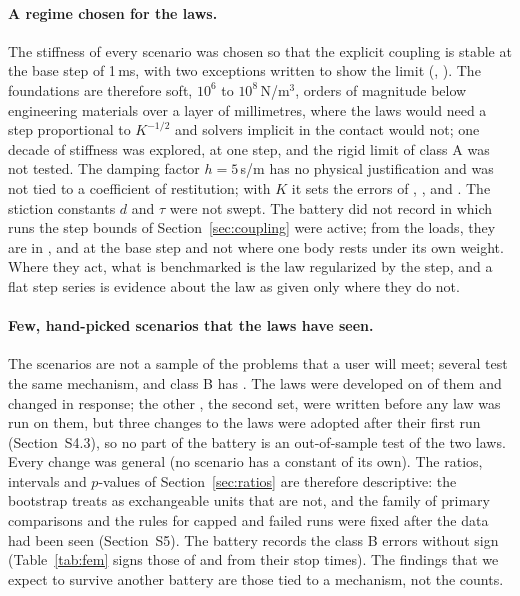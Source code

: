 \paragraph{A regime chosen for the laws.} The stiffness of every scenario was chosen so that
the explicit coupling is stable at the base step of 1\,ms, with two exceptions written to show
the limit (, ). The foundations are therefore soft, $10^6$ to
$10^8$\,N/m$^3$, orders of magnitude below engineering materials over a layer of millimetres,
where the laws would need a step proportional to $K^{-1/2}$ and solvers implicit in the contact
would not; one decade of stiffness was explored, at one step, and the rigid limit of class A
was not tested. The damping factor $h = 5$\,s/m has no physical justification and was not tied
to a coefficient of restitution; with $K$ it sets the errors of , ,
 and . The stiction constants $d$ and $\tau$ were not swept. The
battery did not record in which runs the step bounds of Section~\ref{sec:coupling} were active;
from the loads, they are in ,  and  at the base step and
not where one body rests under its own weight. Where they act, what is benchmarked is the law
regularized by the step, and a flat step series is evidence about the law as given only where
they do not.

\paragraph{Few, hand-picked scenarios that the laws have seen.} The
 scenarios are not a sample of the problems that a user will meet;
several test the same mechanism, and class B has . The laws were developed
on  of them and changed in response; the other ,
the second set, were written before any law was run on them, but three changes to the laws were
adopted after their first run (Section~S4.3), so no part of the battery is an out-of-sample
test of the two laws. Every change was general (no scenario has a constant of its own). The
ratios, intervals and $p$-values of Section~\ref{sec:ratios} are therefore descriptive: the
bootstrap treats as exchangeable units that are not, and the family of primary comparisons and
the rules for capped and failed runs were fixed after the data had been seen (Section~S5). The
battery records the class B errors without sign (Table~\ref{tab:fem} signs those of 
and  from their stop times). The findings that we expect to survive another
battery are those tied to a mechanism, not the counts.

